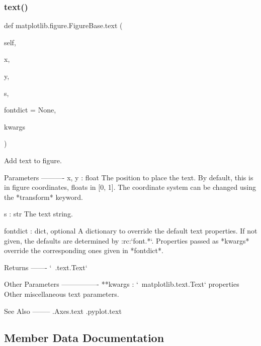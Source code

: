 \begin{DoxyVerb}
\begin{DoxyVerb}
\mbox{\label{classmatplotlib_1_1figure_1_1FigureBase_a703912750190af71c437d7bb8ce3b098}} 
\subsubsection{\texorpdfstring{text()}{text()}}
{\footnotesize\ttfamily def matplotlib.\+figure.\+Figure\+Base.\+text (\begin{DoxyParamCaption}\item[{}]{self,  }\item[{}]{x,  }\item[{}]{y,  }\item[{}]{s,  }\item[{}]{fontdict = {\ttfamily None},  }\item[{}]{kwargs }\end{DoxyParamCaption})}

\begin{DoxyVerb}Add text to figure.

Parameters
----------
x, y : float
    The position to place the text. By default, this is in figure
    coordinates, floats in [0, 1]. The coordinate system can be changed
    using the *transform* keyword.

s : str
    The text string.

fontdict : dict, optional
    A dictionary to override the default text properties. If not given,
    the defaults are determined by :rc:`font.*`. Properties passed as
    *kwargs* override the corresponding ones given in *fontdict*.

Returns
-------
`~.text.Text`

Other Parameters
----------------
**kwargs : `~matplotlib.text.Text` properties
    Other miscellaneous text parameters.


See Also
--------
.Axes.text
.pyplot.text
\end{DoxyVerb}
 

\subsection{Member Data Documentation}
\mbox{\label{classmatplotlib_1_1figure_1_1FigureBase_a2036c6daf6cd8ba5a263c99423d610f4}} 

\end{DoxyVerb}
\end{DoxyVerb}

